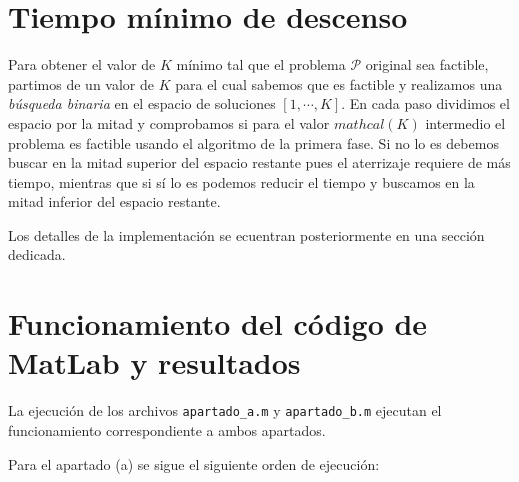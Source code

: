 \documentclass[10pt,a4paper]{article}
\begin{document}
\section{Tiempo mínimo de descenso}
Para obtener el valor de $K$ mínimo tal que el problema $\mathcal{P}$ original sea factible, partimos de un valor de $K$ para el cual sabemos que es factible y realizamos una \textit{búsqueda binaria} en el espacio de soluciones $[1,\cdots,K]$. En cada paso dividimos el espacio por la mitad y comprobamos si para el valor $mathcal(K)$ intermedio el problema es factible usando el algoritmo de la primera fase. Si no lo es debemos buscar en la mitad superior del espacio restante pues el aterrizaje requiere de más tiempo, mientras que si sí lo es podemos reducir el tiempo y buscamos en la mitad inferior del espacio restante.

Los detalles de la implementación se ecuentran posteriormente en una sección dedicada.

\section{Funcionamiento del código de MatLab y resultados}

La ejecución de los archivos \texttt{apartado\_a.m} y \texttt{apartado\_b.m} ejecutan el funcionamiento correspondiente a ambos apartados.

Para el apartado (a) se sigue el siguiente orden de ejecución:
\end{document}
